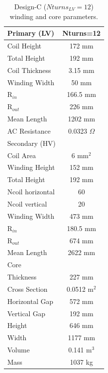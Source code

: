 \documentclass[a4paper, 11pt]{article} %
\begin{document}
\begin{table}[]
\begin{center}
\begin{tabular}{lc}
Primary (LV) & Nturns=12\\
\hline
Coil Height & 172 mm \\
Total Height & 192 mm \\
Coil Thickness & 3.15 mm\\
Winding Width & 50 mm \\
R$_{in}$ & 166.5 mm \\
R$_{out}$ & 226 mm \\
Mean Length & 1202 mm \\
AC Resistance & 0.0323 $\Omega$ \\
\hline
Secondary (HV) \\
Coil Area & 6 mm$^2$\\
Winding Height & 152 mm \\ 
Total Height & 192 mm \\
Ncoil horizontal & 60 \\
Ncoil vertical & 20 \\
Winding Width & 473 mm \\
R$_{in}$ & 180.5 mm \\
R$_{out}$ & 674 mm \\
Mean Length & 2622 mm \\
\hline
Core \\
Thickness & 227 mm \\
Cross Section & 0.0512 m$^2$\\
Horizontal Gap & 572 mm \\
Vertical Gap & 192 mm \\
Height & 646 mm \\
Width & 1177 mm \\
Volume & 0.141 m$^3$ \\
Mass & 1037 kg \\
\hline
\end{tabular} 
\end{center}
\caption{Design-C ($Nturns_{LV}=12$) winding and core parameters.}
\label{design_C}
\end{table}
\end{document}
